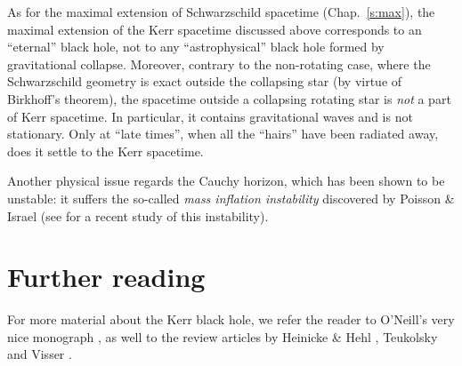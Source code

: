 As for the maximal extension of Schwarzschild spacetime (Chap.~\ref{s:max}), the
maximal extension of the Kerr spacetime discussed above
corresponds to an ``eternal'' black hole, not to any ``astrophysical'' black hole
formed by gravitational
collapse. Moreover, contrary to the non-rotating case, where the Schwarzschild geometry
is exact outside the collapsing star (by virtue of Birkhoff's theorem), the spacetime outside
a collapsing rotating star is \emph{not} a part of Kerr spacetime. In particular, it contains gravitational waves and is not stationary. Only at ``late times'', when all the ``hairs'' have
been radiated away, does it settle to the Kerr spacetime.

Another physical issue regards the Cauchy horizon, which
has been shown to be unstable: it suffers the so-called
\emph{mass inflation instability}
discovered by Poisson \& Israel \cite{PoissI90}
(see \cite{BurkoKZ16} for a recent study of this instability).

\section{Further reading}

For more material about the Kerr black hole, we refer
the reader to O'Neill's very nice monograph \cite{ONeil95},
as well to the review articles by
Heinicke \& Hehl \cite{HeiniH15}, Teukolsky \cite{Teuko15} and
Visser \cite{Visse09}.
